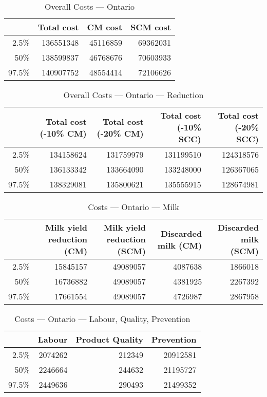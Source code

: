 \documentclass{article}\usepackage[]{graphicx}\usepackage[]{color}
\begin{document}
\begin{table}[ht]
\centering
\begin{tabular}{rrrr}
  \hline
 & Total cost & CM cost & SCM cost \\ 
  \hline
2.5\% & 136551348 & 45116859 & 69362031 \\ 
  50\% & 138599837 & 46768676 & 70603933 \\ 
  97.5\% & 140907752 & 48554414 & 72106626 \\ 
   \hline
\end{tabular}
\caption{Overall Costs --- Ontario} 
\label{tab:ontario:overall}
\end{table}
\begin{table}[ht]
\centering
\begin{tabular}{rrrrr}
  \hline
 & Total cost (-10\% CM) & Total cost (-20\% CM) & Total cost (-10\% SCC) & Total cost (-20\% SCC) \\ 
  \hline
2.5\% & 134158624 & 131759979 & 131199510 & 124318576 \\ 
  50\% & 136133342 & 133664090 & 133248000 & 126367065 \\ 
  97.5\% & 138329081 & 135800621 & 135555915 & 128674981 \\ 
   \hline
\end{tabular}
\caption{Overall Costs --- Ontario --- Reduction} 
\label{tab:ontario:reduction}
\end{table}
\begin{table}[ht]
\centering
\begin{tabular}{rrrrr}
  \hline
 & Milk yield reduction (CM) & Milk yield reduction (SCM) & Discarded milk (CM) & Discarded milk (SCM) \\ 
  \hline
2.5\% & 15845157 & 49089057 & 4087638 & 1866018 \\ 
  50\% & 16736882 & 49089057 & 4381925 & 2267392 \\ 
  97.5\% & 17661554 & 49089057 & 4726987 & 2867958 \\ 
   \hline
\end{tabular}
\caption{Costs --- Ontario --- Milk} 
\label{tab:ontario:a}
\end{table}
\begin{table}[ht]
\centering
\begin{tabular}{rrrr}
  \hline
 & Labour & Product Quality & Prevention \\ 
  \hline
2.5\% & 2074262 & 212349 & 20912581 \\ 
  50\% & 2246664 & 244632 & 21195727 \\ 
  97.5\% & 2449636 & 290493 & 21499352 \\ 
   \hline
\end{tabular}
\caption{Costs --- Ontario --- Labour, Quality, Prevention} 
\label{tab:ontario:b}
\end{table}
\end{document}
